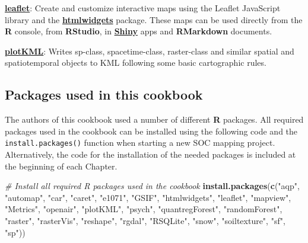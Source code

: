 \documentclass[10pt,b5paper,]{book}
\newenvironment{Shaded}{\begin{snugshade}}{\end{snugshade}}
\newcommand{\CommentTok}[1]{\textcolor[rgb]{0.56,0.35,0.01}{\textit{#1}}}
\newcommand{\KeywordTok}[1]{\textcolor[rgb]{0.13,0.29,0.53}{\textbf{#1}}}
\newcommand{\NormalTok}[1]{#1}
\newcommand{\StringTok}[1]{\textcolor[rgb]{0.31,0.60,0.02}{#1}}
\theoremstyle{definition}
\theoremstyle{definition}
\theoremstyle{definition}
\theoremstyle{remark}
\begin{document}
\href{https://CRAN.R-project.org/package=leaflet}{\textbf{leaflet}}:
Create and customize interactive maps using the Leaflet JavaScript
library and the
\href{https://cran.r-project.org/web/packages/htmlwidgets/index.html}{\textbf{htmlwidgets}}
package. These maps can be used directly from the \textbf{R} console,
from \textbf{RStudio}, in
\href{https://shiny.rstudio.com/}{\textbf{Shiny}} apps and
\textbf{RMarkdown} documents.

\href{https://CRAN.R-project.org/package=plotKML}{\textbf{plotKML}}:
Writes sp-class, spacetime-class, raster-class and similar spatial and
spatiotemporal objects to KML following some basic cartographic rules.

\hypertarget{packages-used-in-this-cookbook}{%
\subsection{Packages used in this
cookbook}\label{packages-used-in-this-cookbook}}

The authors of this cookbook used a number of different \textbf{R}
packages. All required packages used in the cookbook can be installed
using the following code and the \texttt{install.packages()} function
when starting a new SOC mapping project. Alternatively, the code for the
installation of the needed packages is included at the beginning of each
Chapter.

\begin{Shaded}
\begin{Highlighting}[]
\CommentTok{# Install all required R packages used in the cookbook}
\KeywordTok{install.packages}\NormalTok{(}\KeywordTok{c}\NormalTok{(}\StringTok{"aqp"}\NormalTok{, }\StringTok{"automap"}\NormalTok{, }\StringTok{"car"}\NormalTok{, }\StringTok{"caret"}\NormalTok{, }\StringTok{"e1071"}\NormalTok{,}
                   \StringTok{"GSIF"}\NormalTok{, }\StringTok{"htmlwidgets"}\NormalTok{, }\StringTok{"leaflet"}\NormalTok{, }\StringTok{"mapview"}\NormalTok{,}
                   \StringTok{"Metrics"}\NormalTok{, }\StringTok{"openair"}\NormalTok{, }\StringTok{"plotKML"}\NormalTok{, }\StringTok{"psych"}\NormalTok{, }
                   \StringTok{"quantregForest"}\NormalTok{, }\StringTok{"randomForest"}\NormalTok{, }\StringTok{"raster"}\NormalTok{,}
                   \StringTok{"rasterVis"}\NormalTok{, }\StringTok{"reshape"}\NormalTok{, }\StringTok{"rgdal"}\NormalTok{, }\StringTok{"RSQLite"}\NormalTok{,}
                   \StringTok{"snow"}\NormalTok{, }\StringTok{"soiltexture"}\NormalTok{, }\StringTok{"sf"}\NormalTok{, }\StringTok{"sp"}\NormalTok{))}
\end{Highlighting}
\end{Shaded}
\end{document}
